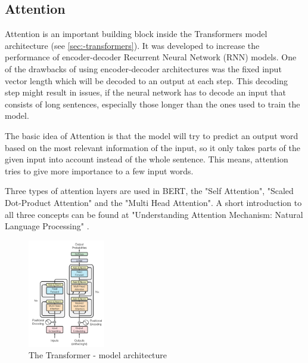     
    
    \subsection{Attention}
    \label{sec:-attention}
    
        Attention is an important building block inside the Transformers model architecture (see \ref{sec:-transformers}).
        It was developed to increase the performance of encoder-decoder Recurrent Neural Network (RNN) models.
        One of the drawbacks of using encoder-decoder architectures was the fixed input vector length which will be decoded to an output at each step.
        This decoding step might result in issues, if the neural network has to decode an input that consists of long sentences, especially those longer than the ones used to train the model.

        The basic idea of Attention is that the model will try to predict an output word based on the most relevant information of the input, so it only takes parts of the given input into account instead of the whole sentence.
        This means, attention tries to give more importance to a few input words.

        Three types of attention layers are used in BERT, the "Self Attention", "Scaled Dot-Product Attention" and the "Multi Head Attention".
        A short introduction to all three concepts can be found at "Understanding Attention Mechanism: Natural Language Processing" \cite{understandingAttention}.

    \begin{figure}
        \caption{The Transformer - model architecture \cite[Figure 1 on page 3]{vaswani2017attention}}
        \begin{center}
            \includegraphics[width=0.3\textwidth]{figures/transformer_model_architecture.png}
        \end{center}
        \label{fig:-transformer-architecture}
    \end{figure}
    
